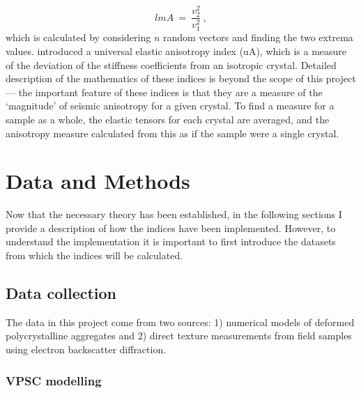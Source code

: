 \documentclass[a4paper,12pt,twoside]{report}
\numberwithin{equation}{chapter}
\begin{document}
\begin{equation}
lmA\ =\ \frac{v_2^2}{v_1^2}\ ,
\end{equation}   
\noindent
which is calculated by considering $n$ random vectors and finding the two extrema values. \cite{Ranganathan2008} introduced a universal elastic anisotropy index (uA), which is a measure of the deviation of the stiffness coefficients from an isotropic crystal. Detailed description of the mathematics of these indices is beyond the scope of this project \citep[for full descriptions see][]{Ledbetter2006,Ranganathan2008} --- the important feature of these indices is that they are a measure of the \lq{}magnitude\rq{} of seismic anisotropy for a given crystal. To find a measure for a sample as a whole, the elastic tensors for each crystal are averaged, and the anisotropy measure calculated from this as if the sample were a single crystal. 

\chapter{Data and Methods} \label{chap:methods}
\vspace{-1cm}

Now that the necessary theory has been established, in the following sections I provide a description of how the indices have been implemented. However, to understand the implementation it is important to first introduce the datasets from which the indices will be calculated.  

\section{Data collection} \label{sec:data}
The data in this project come from two sources: 1) numerical models of deformed polycrystalline aggregates and 2) direct texture measurements from field samples using electron backscatter diffraction. 

\subsection{VPSC modelling}
\end{document}
